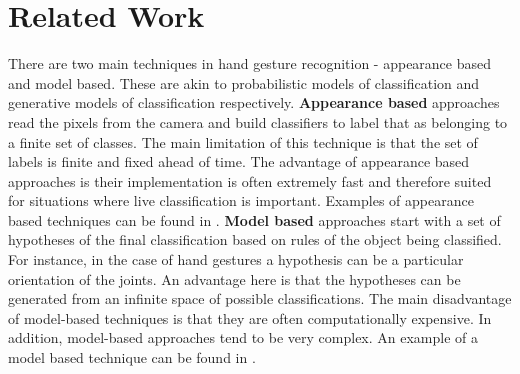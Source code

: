 \section{Related Work }

There are two main techniques in hand gesture recognition - appearance based and model based. These are akin to probabilistic models of classification and generative models of classification respectively. \textbf{Appearance based} approaches read the pixels from the camera and build classifiers to label that as belonging to a finite set of classes. The main limitation of this technique is that the set of labels is finite and fixed ahead of time. The advantage of appearance based approaches is their implementation is often extremely fast and therefore suited for situations where live classification is important. Examples of appearance based techniques can be found in \cite{shotton2011, wang2009}. \textbf{Model based} approaches start with a set of hypotheses of the final classification based on rules of the object being classified. For instance, in the case of hand gestures a hypothesis can be a particular orientation of the joints.  An advantage here is that the hypotheses can be generated from an infinite space of possible classifications. The main disadvantage of model-based techniques is that they are often computationally expensive. In addition, model-based approaches tend to be very complex. An example of a model based technique can be found in \cite{oikonomidis2011}.